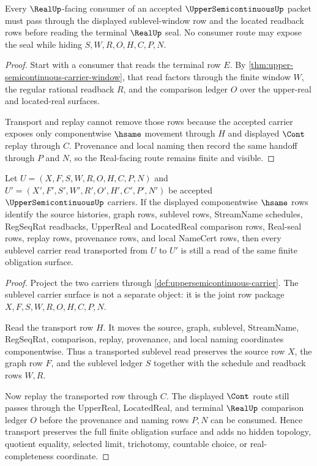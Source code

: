 \begin{theorem}\label{thm:upper-semicontinuous-real-handoff}
Every $\RealUp$-facing consumer of an accepted $\UpperSemicontinuousUp$ packet must pass through the displayed sublevel-window row and the located readback rows before reading the terminal $\RealUp$ seal. No consumer route may expose the seal while hiding $S,W,R,O,H,C,P,N$.
\end{theorem}
\begin{proof}
Start with a consumer that reads the terminal row $E$. By \autoref{thm:upper-semicontinuous-carrier-window}, that read factors through the finite window $W$, the regular rational readback $R$, and the comparison ledger $O$ over the upper-real and located-real surfaces.

Transport and replay cannot remove those rows because the accepted carrier exposes only componentwise $\hsame$ movement through $H$ and displayed $\Cont$ replay through $C$. Provenance and local naming then record the same handoff through $P$ and $N$, so the Real-facing route remains finite and visible.
\end{proof}

\begin{theorem}
\label{thm:uppersemicontinuous-sublevel-carrier-transport}
Let $U=(X,F,S,W,R,O,H,C,P,N)$ and $U'=(X',F',S',W',R',O',H',C',P',N')$ be accepted $\UpperSemicontinuousUp$ carriers. If the displayed componentwise $\hsame$ rows identify the source histories, graph rows, sublevel rows, StreamName schedules, RegSeqRat readbacks, UpperReal and LocatedReal comparison rows, Real-seal rows, replay rows, provenance rows, and local NameCert rows, then every sublevel carrier read transported from $U$ to $U'$ is still a read of the same finite obligation surface.
\end{theorem}
\begin{proof}
Project the two carriers through \autoref{def:uppersemicontinuous-carrier}. The sublevel carrier surface is not a separate object: it is the joint row package $X,F,S,W,R,O,H,C,P,N$.

Read the transport row $H$. It moves the source, graph, sublevel, StreamName, RegSeqRat, comparison, replay, provenance, and local naming coordinates componentwise. Thus a transported sublevel read preserves the source row $X$, the graph row $F$, and the sublevel ledger $S$ together with the schedule and readback rows $W,R$.

Now replay the transported row through $C$. The displayed $\Cont$ route still passes through the UpperReal, LocatedReal, and terminal $\RealUp$ comparison ledger $O$ before the provenance and naming rows $P,N$ can be consumed. Hence transport preserves the full finite obligation surface and adds no hidden topology, quotient equality, selected limit, trichotomy, countable choice, or real-completeness coordinate.
\end{proof}

